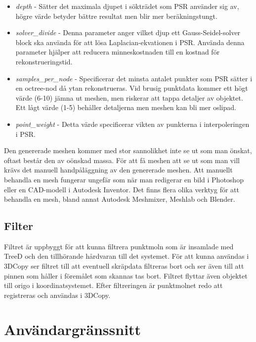 \documentclass[a4paper,titlepage,12pt]{article}
\begin{document}
		\begin{itemize}
			\item \textit{depth} - Sätter det maximala djupet i sökträdet som PSR använder sig av, högre värde betyder bättre resultat men blir mer beräkningstungt.
			\item \textit{solver\_divide} - Denna parameter anger vilket djup ett Gauss-Seidel-solver block ska använda för att lösa Laplacian-ekvationen i PSR. Använda denna parameter hjälper att reducera minneskostnaden till en kostnad för rekonstrueringstid.
			\item \textit{samples\_per\_node} - Specificerar det minsta antalet punkter som PSR sätter i en octree-nod då ytan rekonstrueras. Vid brusig punktdata kommer ett högt värde (6-10) jämna ut meshen, men riskerar att tappa detaljer av objektet. Ett lågt värde (1-5) behåller detaljerna men meshen kan bli mer oslipad.
			\item \textit{point\_weight} -  Detta värde specificerar vikten av punkterna i interpoleringen i PSR.
		\end{itemize}
	
		Den genererade meshen kommer med stor sannolikhet inte se ut som man önskat, oftast består den av oönskad massa. För att få meshen att se ut som man vill krävs det manuell handpåläggning av den genererade meshen. Att manuellt behandla en mesh fungerar ungefär som när man redigerar en bild i Photoshop eller en CAD-modell i Autodesk Inventor. Det finns flera olika verktyg för att behandla en mesh, bland annat Autodesk Meshmixer, Meshlab och Blender.
		
	
	\subsection{Filter}
		Filtret är uppbyggt för att kunna filtrera punktmoln som är insamlade med TreeD och den tillhörande hårdvaran till det systemet. För att kunna användas i 3DCopy ser filtret till att eventuell skräpdata filtreras bort och ser även till att pinnen som håller i föremålet som skannas tas bort. Filtret flyttar även objektet till origo i koordinatsystemet. Efter filtreringen är punktmolnet redo att registreras och användas i 3DCopy.
		
\newpage
 
\section{Användargränssnitt}
\end{document}
